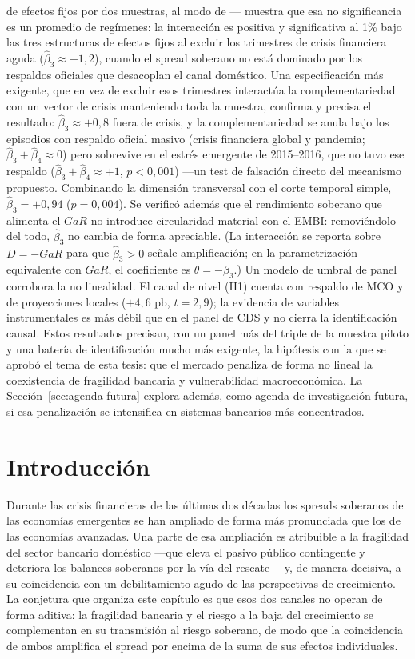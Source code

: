 de efectos fijos por dos muestras, al modo de \citet{Chari2024b}— muestra que esa no significancia es un promedio de regímenes: la interacción es positiva y significativa al 1\% bajo las tres estructuras de efectos fijos al excluir los trimestres de crisis financiera aguda ($\hat\beta_3\approx+1{,}2$), cuando el spread soberano no está dominado por los respaldos oficiales que desacoplan el canal doméstico. Una especificación más exigente, que en vez de excluir esos trimestres interactúa la complementariedad con un vector de crisis manteniendo toda la muestra, confirma y precisa el resultado: $\hat\beta_3\approx+0{,}8$ fuera de crisis, y la complementariedad se anula bajo los episodios con respaldo oficial masivo (crisis financiera global y pandemia; $\hat\beta_3+\hat\beta_4\approx0$) pero sobrevive en el estrés emergente de 2015--2016, que no tuvo ese respaldo ($\hat\beta_3+\hat\beta_4\approx+1$, $p<0{,}001$) —un test de falsación directo del mecanismo propuesto. Combinando la dimensión transversal con el corte temporal simple, $\hat\beta_3=+0{,}94$ ($p=0{,}004$). Se verificó además que el rendimiento soberano que alimenta el $GaR$ no introduce circularidad material con el EMBI: removiéndolo del todo, $\hat\beta_3$ no cambia de forma apreciable. (La interacción se reporta sobre $D=-GaR$ para que $\hat\beta_3>0$ señale amplificación; en la parametrización equivalente con $GaR$, el coeficiente es $\theta=-\beta_3$.) Un modelo de umbral de panel \citep{Hansen1999,Hansen2000} corrobora la no linealidad. El canal de nivel (H1) cuenta con respaldo de MCO y de proyecciones locales ($+4{,}6$ pb, $t=2{,}9$); la evidencia de variables instrumentales es más débil que en el panel de CDS y no cierra la identificación causal. Estos resultados precisan, con un panel más del triple de la muestra piloto y una batería de identificación mucho más exigente, la hipótesis con la que se aprobó el tema de esta tesis: que el mercado penaliza de forma no lineal la coexistencia de fragilidad bancaria y vulnerabilidad macroeconómica. La Sección~\ref{sec:agenda-futura} explora además, como agenda de investigación futura, si esa penalización se intensifica en sistemas bancarios más concentrados.

\section{Introducción}

Durante las crisis financieras de las últimas dos décadas los spreads soberanos de las economías emergentes se han ampliado de forma más pronunciada que los de las economías avanzadas. Una parte de esa ampliación es atribuible a la fragilidad del sector bancario doméstico —que eleva el pasivo público contingente y deteriora los balances soberanos por la vía del rescate— y, de manera decisiva, a su coincidencia con un debilitamiento agudo de las perspectivas de crecimiento. La conjetura que organiza este capítulo es que esos dos canales no operan de forma aditiva: la fragilidad bancaria y el riesgo a la baja del crecimiento se complementan en su transmisión al riesgo soberano, de modo que la coincidencia de ambos amplifica el spread por encima de la suma de sus efectos individuales.

